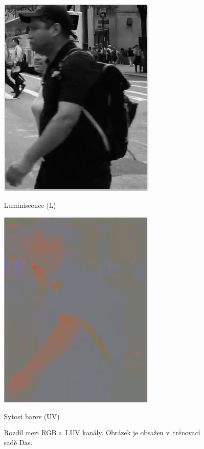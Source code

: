 \begin{figure}[H]
\begin{minipage}[b]{.3\textwidth}
  \includegraphics[width=.8\linewidth]{figures/luma}
  \caption*{Luminiscence  (L)}
\end{minipage}
\begin{minipage}[b]{.3\textwidth}
  \centering
  \includegraphics[width=.8\linewidth]{figures/uv_chroma}
  \caption*{Sytost barev (UV)}
\end{minipage}
\caption{Rozdíl mezi RGB a~LUV kanály. Obrázek je obsažen v~trénovací sadě Das\cite{sudipdas}.}
\label{fig:luv}
\end{figure}

